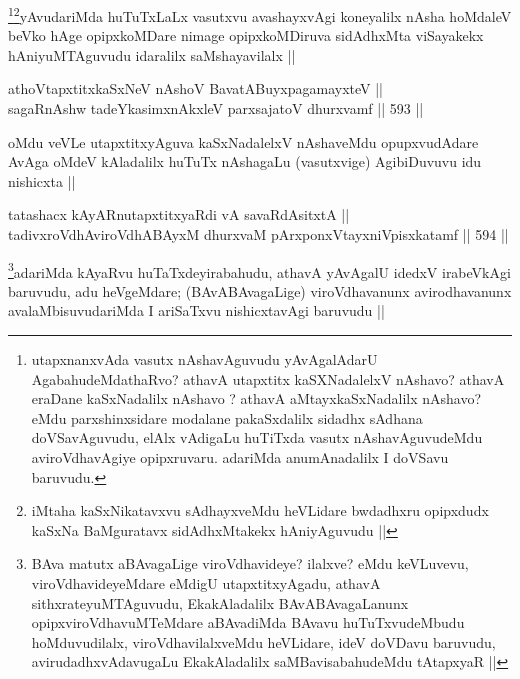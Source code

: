 \begin{artha}
\footnote{utapxnanxvAda vasutx nAshavAguvudu yAvAgalAdarU AgabahudeMdathaRvo? athavA utapxtitx kaSXNadalelxV nAshavo? athavA eraDane kaSxNadalilx nAshavo
? athavA aMtayxkaSxNadalilx nAshavo? eMdu parxshinxsidare modalane pakaSxdalilx sidadhx sAdhana doVSavAguvudu, elAlx vAdigaLu huTiTxda vasutx nAshavAguvudeMdu aviroVdhavAgiye opipxruvaru. adariMda anumAnadalilx I doVSavu baruvudu.}\footnote{iMtaha kaSxNikatavxvu sAdhayxveMdu heVLidare bwdadhxru opipxdudx kaSxNa BaMguratavx sidAdhxMtakekx hAniyAguvudu ||}yAvudariMda huTuTxLaLx vasutxvu avashayxvAgi koneyalilx nAsha hoMdaleV beVko hAge opipxkoMDare nimage opipxkoMDiruva sidAdhxMta viSayakekx hAniyuMTAguvudu idaralilx saMshayavilalx ||  
\end{artha}

\begin{shl}
athoVtapxtitxkaSxNeV nAshoV BavatA\s BuyxpagamayxteV || \\
sagaRnAshw tadeYkasimxnAkxleV parxsajatoV dhurxvamf ||  593 ||  
\end{shl}

\begin{artha}
oMdu veVLe utapxtitxyAguva kaSxNadalelxV nAshaveMdu opupxvudAdare AvAga oMdeV kAladalilx huTuTx nAshagaLu (vasutxvige) AgibiDuvuvu idu nishicxta ||
\end{artha}


\begin{shl}
tatashacx kAyARnutapxtitxyaRdi vA savaRdA\s sitxtA || \\
tadivxroVdhAviroVdhABAyxM dhurxvaM pArxponxVtayxniVpisxkatamf ||  594 ||  
\end{shl}

\begin{artha}
\footnote{BAva matutx aBAvagaLige viroVdhavideye? ilalxve? eMdu keVLuvevu, viroVdhavideyeMdare eMdigU utapxtitxyAgadu, athavA sithxrateyuMTAguvudu, EkakAladalilx BAvABAvagaLanunx opipxviroVdhavuMTeMdare aBAvadiMda BAvavu huTuTxvudeMbudu hoMduvudilalx, viroVdhavilalxveMdu heVLidare, ideV doVDavu baruvudu, avirudadhxvAdavugaLu EkakAladalilx saMBavisabahudeMdu tAtapxyaR ||}adariMda kAyaRvu huTaTxdeyirabahudu, athavA yAvAgalU idedxV irabeVkAgi baruvudu, adu heVgeMdare; (BAvABAvagaLige) viroVdhavanunx avirodhavanunx avalaMbisuvudariMda I ariSaTxvu nishicxtavAgi baruvudu ||
\end{artha}


